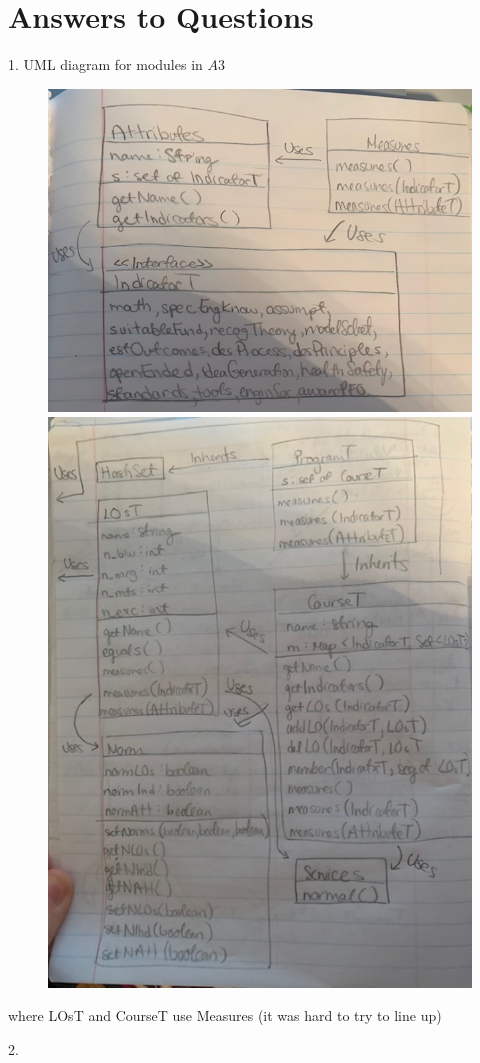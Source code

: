 \documentclass[12pt]{article}
\begin{document}
\newpage

\section* {Answers to Questions}

\item 1. UML diagram for modules in $A3$

\begin{figure}[ht]
\centering
\begin{minipage}[b]{0.45\linewidth}
	\includegraphics[scale=0.3]{IMG_3018}
\end{minipage}
	\quad
\begin{minipage}[b]{0.45\linewidth}
	\includegraphics[scale=0.3]{IMG_3017}
\end{minipage}
\end{figure}

\noindent where LOsT and CourseT use Measures (it was hard to try to line up)

\item 2. 
\end{document}
